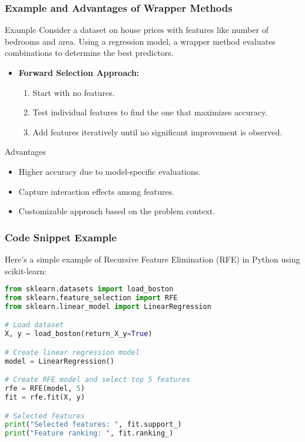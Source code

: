 \documentclass[aspectratio=169]{beamer}
\begin{document}
\begin{frame}[fragile]
  \frametitle{Example and Advantages of Wrapper Methods}
  \begin{block}{Example}
      Consider a dataset on house prices with features like number of bedrooms and area. Using a regression model, a wrapper method evaluates combinations to determine the best predictors.
      \begin{itemize}
          \item \textbf{Forward Selection Approach:}
            \begin{enumerate}
              \item Start with no features.
              \item Test individual features to find the one that maximizes accuracy.
              \item Add features iteratively until no significant improvement is observed.
            \end{enumerate}
      \end{itemize}
  \end{block}
  
  \begin{block}{Advantages}
      \begin{itemize}
        \item Higher accuracy due to model-specific evaluations.
        \item Capture interaction effects among features.
        \item Customizable approach based on the problem context.
      \end{itemize}
  \end{block}
\end{frame}

\begin{frame}[fragile]
  \frametitle{Code Snippet Example}
  Here’s a simple example of Recursive Feature Elimination (RFE) in Python using scikit-learn:

  \begin{lstlisting}[language=Python]
from sklearn.datasets import load_boston
from sklearn.feature_selection import RFE
from sklearn.linear_model import LinearRegression

# Load dataset
X, y = load_boston(return_X_y=True)

# Create linear regression model
model = LinearRegression()

# Create RFE model and select top 5 features
rfe = RFE(model, 5)
fit = rfe.fit(X, y)

# Selected features
print("Selected features: ", fit.support_)
print("Feature ranking: ", fit.ranking_)
  \end{lstlisting}
\end{frame}
\end{document}
